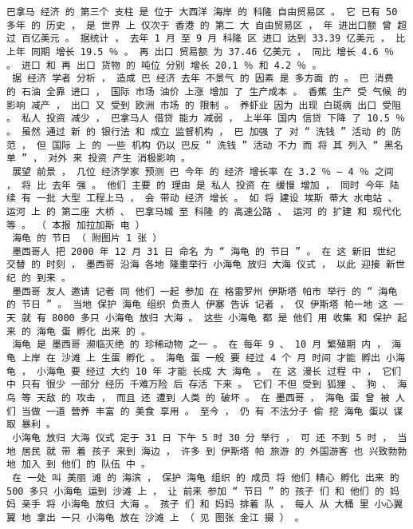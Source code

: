 \documentclass{article}
\begin{document}
\begin{Verbatim}[commandchars=\\\{\}]
 巴拿马 经济 的 第三个 支柱 是 位于 大西洋 海岸 的 科隆 自由贸易区 。 它 已有 50 多年 的 历史 ， 是 世界 上 仅次于 香港 的 第二 大 自由贸易区 ， 年 进出口额 曾 超过 百亿美元 。 据统计 ， 去年 1 月 至 9 月 科隆 区 进口 达到 33.39 亿美元 ， 比 上年 同期 增长 19.5 ％ 。 再 出口 贸易额 为 37.46 亿美元 ， 同比 增长 4.6 ％ 。 进口 和 再 出口 货物 的 吨位 分别 增长 20.1 ％ 和 4.2 ％ 。 
 据 经济 学者 分析 ， 造成 巴 经济 去年 不景气 的 因素 是 多方面 的 。 巴 消费 的 石油 全靠 进口 ， 国际 市场 油价 上涨 增加 了 生产成本 。 香蕉 生产 受 气候 的 影响 减产 ， 出口 又 受到 欧洲 市场 的 限制 。 养虾业 因为 出现 白斑病 出口 受阻 。 私人 投资 减少 ， 巴拿马人 借贷 能力 减弱 ， 上半年 国内 信贷 下降 了 10.5 ％ 。 虽然 通过 新 的 银行法 和 成立 监督机构 ， 巴 加强 了 对 “ 洗钱 ” 活动 的 防范 ， 但 国际 上 的 一些 机构 仍以 巴反 “ 洗钱 ” 活动 不力 而 将 其 列入 “ 黑名单 ” ， 对外 来 投资 产生 消极影响 。 
 展望 前景 ， 几位 经济学家 预测 巴 今年 的 经济 增长率 在 3.2 ％ — 4 ％ 之间 ， 将 比 去年 强 。 他们 主要 的 理由 是 私人 投资 在 缓慢 增加 ， 同时 今年 陆续 有 一批 大型 工程上马 ， 会 带动 经济 增长 。 如 将 建设 埃斯 蒂大 水电站 、 运河 上 的 第二座 大桥 、 巴拿马城 至 科隆 的 高速公路 、 运河 的 扩建 和 现代化 等 。 （ 本报 加拉加斯 电 ） 
 海龟 的 节日 （ 附图片 1 张 ） 
 墨西哥人 把 2000 年 12 月 31 日 命名 为 “ 海龟 的 节日 ” 。 在 这 新旧 世纪 交替 的 时刻 ， 墨西哥 沿海 各地 隆重举行 小海龟 放归 大海 仪式 ， 以此 迎接 新世纪 的 到来 。 
 墨西哥 友人 邀请 记者 同 他们 一起 参加 在 格雷罗州 伊斯塔 帕市 举行 的 “ 海龟 的 节日 ” 。 当地 保护 海龟 组织 负责人 伊塞 告诉 记者 ， 仅 伊斯塔 帕一地 这 一天 就 有 8000 多只 小海龟 放归 大海 。 这些 小海龟 都 是 他们 用 收集 和 保护 起来 的 海龟 蛋 孵化 出来 的 。 
 海龟 是 墨西哥 濒临灭绝 的 珍稀动物 之一 。 在 每年 9 、 10 月 繁殖期 内 ， 海龟 上岸 在 沙滩 上 生蛋 孵化 。 海龟 蛋 一般 要 经过 4 个 月 时间 才能 孵出 小海龟 ， 小海龟 要 经过 大约 10 年 才能 长成 大 海龟 。 在 这 漫长 过程 中 ， 它们 中 只有 很少 一部分 经历 千难万险 后 存活 下来 。 它们 不但 受到 狐狸 、 狗 、 海鸟 等 天敌 的 攻击 ， 而且 还 遭到 人类 的 破坏 。 在 墨西哥 ， 海龟 蛋 曾 被 人们 当做 一道 营养 丰富 的 美食 享用 。 至今 ， 仍 有 不法分子 偷 挖 海龟 蛋以 谋取 暴利 。 
 小海龟 放归 大海 仪式 定于 31 日 下午 5 时 30 分 举行 ， 可 还 不到 5 时 ， 当地 居民 就 带 着 孩子 来到 海边 ， 许多 到 伊斯塔 帕 旅游 的 外国游客 也 兴致勃勃 地 加入 到 他们 的 队伍 中 。 
 在 一处 叫 美丽 滩 的 海滨 ， 保护 海龟 组织 的 成员 将 他们 精心 孵化 出来 的 500 多只 小海龟 运到 沙滩 上 ， 让 前来 参加 “ 节日 ” 的 孩子 们 和 他们 的 妈妈 亲手 将 小海龟 放归 大海 。 孩子 们 和 妈妈 排着 队 ， 每人 从 大桶 里 小心翼翼 地 拿出 一只 小海龟 放在 沙滩 上 （ 见 图张 金江 摄 ） 。 

\end{Verbatim}
\end{document}
